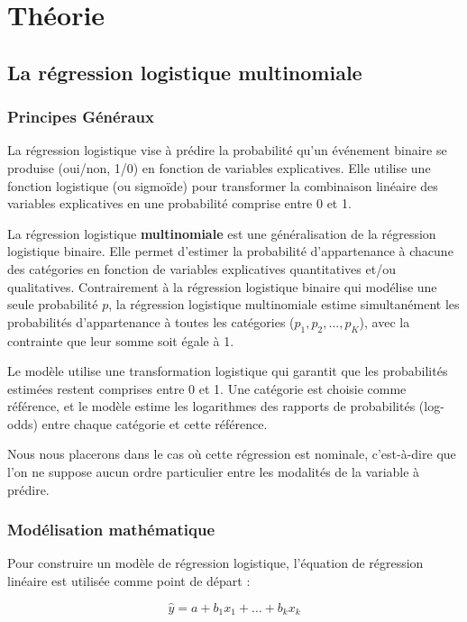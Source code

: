 \documentclass[10pt,french]{report}
\begin{document}
	\chapter{Théorie}

	\section{La régression logistique multinomiale}
	\subsection{Principes Généraux}
	La régression logistique vise à prédire la probabilité qu'un événement binaire se produise (oui/non, 1/0) en fonction de variables explicatives. Elle utilise une fonction logistique (ou sigmoïde) pour transformer la combinaison linéaire des variables explicatives en une probabilité comprise entre 0 et 1.

	La régression logistique \textbf{multinomiale} est une généralisation de la régression logistique binaire. Elle permet d'estimer la probabilité d'appartenance à chacune des catégories en fonction de variables explicatives quantitatives et/ou qualitatives. Contrairement à la régression logistique binaire qui modélise une seule probabilité $p$, la régression logistique multinomiale estime simultanément les probabilités d'appartenance à toutes les catégories ($p_1, p_2, ..., p_K$), avec la contrainte que leur somme soit égale à 1.

	Le modèle utilise une transformation logistique qui garantit que les probabilités estimées restent comprises entre 0 et 1. Une catégorie est choisie comme référence, et le modèle estime les logarithmes des rapports de probabilités (log-odds) entre chaque catégorie et cette référence.

	Nous nous placerons dans le cas où cette régression est nominale, c'est-à-dire que l'on ne suppose aucun ordre particulier entre les modalités de la variable à prédire.

    \subsection{Modélisation mathématique}

    Pour construire un modèle de régression logistique, l'équation de régression linéaire est utilisée comme point de départ\cite{datatab, ricco} :

     \begin{equation}
         \hat{y} = a + b_1x_1 + \ldots + b_kx_k
     \end{equation}
\end{document}

